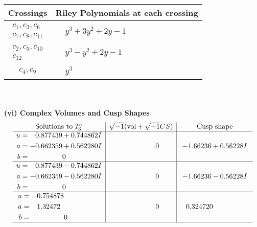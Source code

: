 \documentclass[1p]{elsarticle_modified}
\theoremstyle{definition}
\newcommand{\I}{\sqrt{-1}}
\begin{document}
\begin{tabular}{m{50pt}|m{274pt}}
Crossings & \hspace{64pt}Riley Polynomials at each crossing \\
\hline $$\begin{aligned}c_{1},c_{3},c_{6}\\c_{7},c_{8},c_{11}\end{aligned}$$&$\begin{aligned}
&y^3+3 y^2+2 y-1
\end{aligned}$\\
\hline $$\begin{aligned}c_{2},c_{5},c_{10}\\c_{12}\end{aligned}$$&$\begin{aligned}
&y^3- y^2+2 y-1
\end{aligned}$\\
\hline $$\begin{aligned}c_{4},c_{9}\end{aligned}$$&$\begin{aligned}
&y^3
\end{aligned}$\\
\hline
\end{tabular}\\~\\
\newpage\flushleft \textbf{(vi) Complex Volumes and Cusp Shapes}
$$\begin{array}{c|c|c}  
\text{Solutions to }I^u_{3}& \I (\text{vol} + \sqrt{-1}CS) & \text{Cusp shape}\\
 \hline 
\begin{aligned}
u &= \phantom{-}0.877439 + 0.744862 I \\
a &= -0.662359 + 0.562280 I \\
b &= \phantom{-0.000000 } 0\end{aligned}
 & \phantom{-0.000000 } 0 & -1.66236 + 0.56228 I \\ \hline\begin{aligned}
u &= \phantom{-}0.877439 - 0.744862 I \\
a &= -0.662359 - 0.562280 I \\
b &= \phantom{-0.000000 } 0\end{aligned}
 & \phantom{-0.000000 } 0 & -1.66236 - 0.56228 I \\ \hline\begin{aligned}
u &= -0.754878\phantom{ +0.000000I} \\
a &= \phantom{-}1.32472\phantom{ +0.000000I} \\
b &= \phantom{-0.000000 } 0\end{aligned}
 & \phantom{-0.000000 } 0 & \phantom{-}0.324720\phantom{ +0.000000I}\\
 \hline 
 \end{array}$$\newpage
\end{document}

